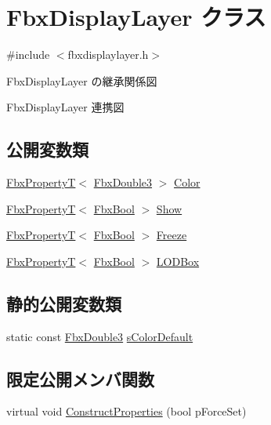 \hypertarget{class_fbx_display_layer}{}\section{Fbx\+Display\+Layer クラス}
\label{class_fbx_display_layer}


{\ttfamily \#include $<$fbxdisplaylayer.\+h$>$}



Fbx\+Display\+Layer の継承関係図


Fbx\+Display\+Layer 連携図
\subsection*{公開変数類}
\begin{DoxyCompactItemize}
\item 
\hyperlink{class_fbx_property_t}{Fbx\+PropertyT}$<$ \hyperlink{fbxtypes_8h_ae0a96f14cde566774c7553aa7523b7a7}{Fbx\+Double3} $>$ \hyperlink{class_fbx_display_layer_ab43c4c4514ffc390a0ae1d7997a2bf06}{Color}
\item 
\hyperlink{class_fbx_property_t}{Fbx\+PropertyT}$<$ \hyperlink{fbxtypes_8h_a92e0562b2fe33e76a242f498b362262e}{Fbx\+Bool} $>$ \hyperlink{class_fbx_display_layer_a06b26abb009bd57c5472c134c3dff9e1}{Show}
\item 
\hyperlink{class_fbx_property_t}{Fbx\+PropertyT}$<$ \hyperlink{fbxtypes_8h_a92e0562b2fe33e76a242f498b362262e}{Fbx\+Bool} $>$ \hyperlink{class_fbx_display_layer_abbda272dffabbf9c54947efefcce141a}{Freeze}
\item 
\hyperlink{class_fbx_property_t}{Fbx\+PropertyT}$<$ \hyperlink{fbxtypes_8h_a92e0562b2fe33e76a242f498b362262e}{Fbx\+Bool} $>$ \hyperlink{class_fbx_display_layer_ae1e076e8613ebc76150369577dbba985}{L\+O\+D\+Box}
\end{DoxyCompactItemize}
\subsection*{静的公開変数類}
\begin{DoxyCompactItemize}
\item 
static const \hyperlink{fbxtypes_8h_ae0a96f14cde566774c7553aa7523b7a7}{Fbx\+Double3} \hyperlink{class_fbx_display_layer_a41bcfbb4b645d20daba8da41307fc1a5}{s\+Color\+Default}
\end{DoxyCompactItemize}
\subsection*{限定公開メンバ関数}
\begin{DoxyCompactItemize}
\item 
virtual void \hyperlink{class_fbx_display_layer_a5712965749ccf41c758913d2a0ebc0c9}{Construct\+Properties} (bool p\+Force\+Set)
\end{DoxyCompactItemize}
